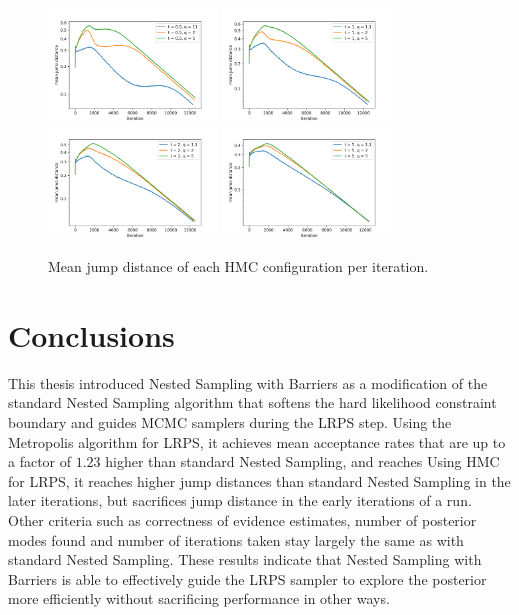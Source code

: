\documentclass[12pt, a4paper]{report}
\begin{document}
\begin{figure}
    \centering
    \includegraphics[width=0.4\textwidth]{figs/results/params/jump_distances_hmc_t_05}
    \includegraphics[width=0.4\textwidth]{figs/results/params/jump_distances_hmc_t_1}
    \includegraphics[width=0.4\textwidth]{figs/results/params/jump_distances_hmc_t_2}
    \includegraphics[width=0.4\textwidth]{figs/results/params/jump_distances_hmc_t_5}
    \caption{Mean jump distance of each HMC configuration per iteration.}
    \label{fig:results_params_jump_distances_hmc}
\end{figure}

\chapter{Conclusions}
This thesis introduced Nested Sampling with Barriers as a modification of the standard Nested Sampling algorithm that softens the hard likelihood constraint boundary and guides MCMC samplers during the LRPS step.
Using the Metropolis algorithm for LRPS, it achieves mean acceptance rates that are up to a factor of $1.23$ higher than standard Nested Sampling, and reaches
Using HMC for LRPS, it reaches higher jump distances than standard Nested Sampling in the later iterations, but sacrifices jump distance in the early iterations of a run.
Other criteria such as correctness of evidence estimates, number of posterior modes found and number of iterations taken stay largely the same as with standard Nested Sampling.
These results indicate that Nested Sampling with Barriers is able to effectively guide the LRPS sampler to explore the posterior more efficiently without sacrificing performance in other ways.
\end{document}
